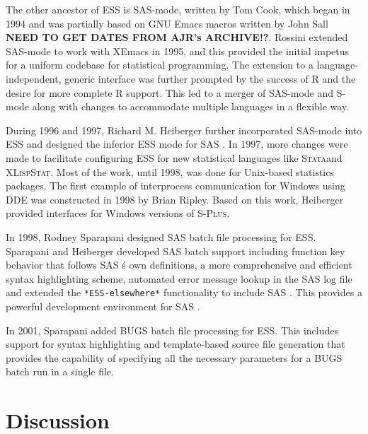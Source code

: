 \documentclass{article}
\newcommand*{\SAS}{\textsc{SAS}{\textregistered} }
\newcommand*{\Splus}{\textsc{S-Plus}}
\newcommand*{\XLispStat}{\textsc{XLispStat}}
\newcommand*{\Stata}{\textsc{Stata}}
\newcommand{\stexttt}[1]{{\small\texttt{#1}}}
\begin{document}
The other ancestor of ESS is SAS-mode,
written by Tom Cook, which began in 1994 and was partially based on
GNU Emacs macros written by John Sall \textbf{NEED TO GET
  DATES FROM AJR's ARCHIVE!?}.  Rossini extended SAS-mode to work with
XEmacs in 1995, and this provided the initial
impetus for a uniform codebase for statistical programming.
The extension to a language-independent, generic interface was further prompted
by the success of R and the desire for more complete R support.  This led to a merger
of SAS-mode and S-mode along with changes 
to accommodate multiple languages in a flexible way.

During 1996 and 1997, Richard M. Heiberger further incorporated
SAS-mode into ESS and designed the inferior ESS mode for \SAS.  In
1997, more changes were made to facilitate  
configuring ESS for new statistical languages like \Stata and \XLispStat.
Most of the work, until 1998, was done for Unix-based statistics packages.
The first example of interprocess communication for Windows using DDE
was constructed in 1998 by Brian Ripley.  Based on this work, Heiberger provided 
interfaces for Windows versions of \Splus.

In 1998, Rodney Sparapani designed \SAS batch file processing for ESS.
Sparapani and Heiberger developed \SAS batch support including function
key behavior that follows \SAS{\'s} own definitions,
a more comprehensive and efficient syntax highlighting scheme,
automated error message lookup in the \SAS log file and extended the
\stexttt{*ESS-elsewhere*} functionality to include \SAS.  This provides
a powerful development environment for \SAS.

In 2001, Sparapani added BUGS batch file processing for ESS.  This 
includes support for syntax highlighting and template-based source file
generation that provides the capability of specifying all the necessary
parameters for a BUGS batch run in a single file.

\section{Discussion}
\label{sec:discussion}
\end{document}
